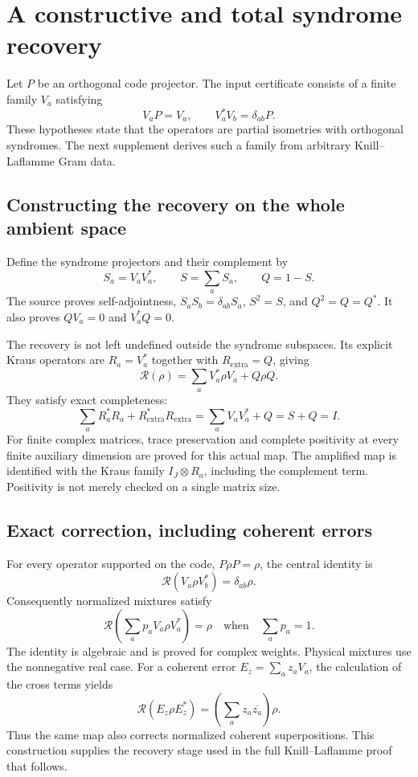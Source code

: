 \section{A constructive and total syndrome recovery}\label{supp4:section:003}
Let $P$ be an orthogonal code projector. The input certificate consists of a finite family $V_a$ satisfying
\[
V_aP=V_a,
\qquad
V_a^*V_b=\delta_{ab}P.
\]
These hypotheses state that the operators are partial isometries with orthogonal syndromes. The next supplement derives such a family from arbitrary Knill--Laflamme Gram data.

\subsection{Constructing the recovery on the whole ambient space}
Define the syndrome projectors and their complement by
\[
S_a=V_aV_a^*,\qquad S=\sum_aS_a,\qquad Q=1-S.
\]
The source proves self-adjointness, $S_aS_b=\delta_{ab}S_a$, $S^2=S$, and $Q^2=Q=Q^*$. It also proves $QV_a=0$ and $V_a^*Q=0$.

The recovery is not left undefined outside the syndrome subspaces. Its explicit Kraus operators are $R_a=V_a^*$ together with $R_{\mathrm{extra}}=Q$, giving
\[
\mathcal R(\rho)=\sum_aV_a^*\rho V_a+Q\rho Q.
\]
They satisfy exact completeness:
\[
\sum_aR_a^*R_a+R_{\mathrm{extra}}^*R_{\mathrm{extra}}
=\sum_aV_aV_a^*+Q=S+Q=I.
\]
For finite complex matrices, trace preservation and complete positivity at every finite auxiliary dimension are proved for this actual map. The amplified map is identified with the Kraus family $I_J\otimes R_a$, including the complement term. Positivity is not merely checked on a single matrix size.

\subsection{Exact correction, including coherent errors}
For every operator supported on the code, $P\rho P=\rho$, the central identity is
\[
\boxed{\mathcal R(V_a\rho V_b^*)=\delta_{ab}\rho.}
\]
Consequently normalized mixtures satisfy
\[
\mathcal R\!\left(\sum_ap_aV_a\rho V_a^*\right)=\rho
\quad\text{when}\quad\sum_ap_a=1.
\]
The identity is algebraic and is proved for complex weights. Physical mixtures use the nonnegative real case. For a coherent error $E_z=\sum_a z_aV_a$, the calculation of the cross terms yields
\[
\mathcal R(E_z\rho E_z^*)=\left(\sum_a z_a\overline{z_a}\right)\rho.
\]
Thus the same map also corrects normalized coherent superpositions. This construction supplies the recovery stage used in the full Knill--Laflamme proof that follows.



